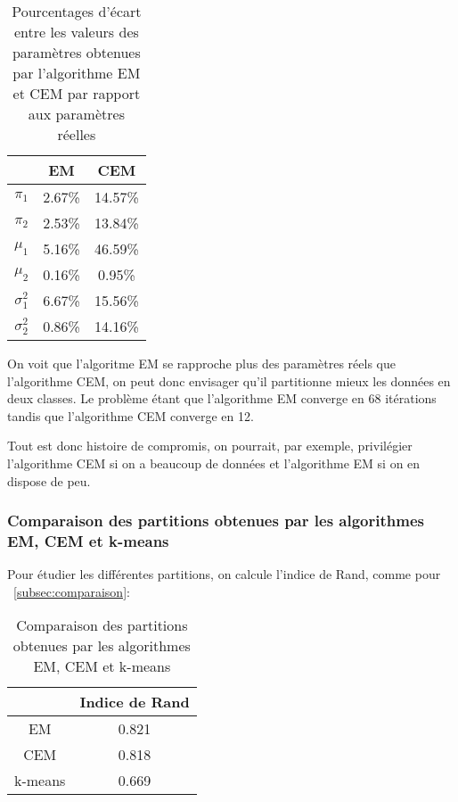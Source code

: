 \documentclass{article}
\begin{document}
\begin{multicols}{2}
\begin{table}[H]
\begin{center}
    \centering
    \captionsetup{justification=centering}
    \caption{\label{tab:percentEcart}Pourcentages d'écart entre les valeurs des paramètres obtenues par l'algorithme EM et CEM par rapport aux paramètres réelles}
    \begin{tabular}{|c|c|c|}
        \hline
        & EM & CEM \\
        \hline
        $\pi_1$ & 2.67\% & 14.57\% \\
        \hline
        $\pi_2$ & 2.53\% & 13.84\% \\
        \hline
        $\mu_1$ & 5.16\% & 46.59\% \\
        \hline
        $\mu_2$ & 0.16\% & 0.95\% \\
        \hline
        $\sigma_1^2$ & 6.67\% & 15.56\% \\
        \hline
        $\sigma_2^2$ & 0.86\% & 14.16\% \\
        \hline
    \end{tabular}
\end{center}
\end{table}

On voit que l'algoritme EM se rapproche plus des paramètres réels que
l'algorithme CEM, on peut donc envisager qu'il partitionne mieux les données en
deux classes. Le problème étant que l'algorithme EM converge en 68 itérations
tandis que l'algorithme CEM converge en 12.

Tout est donc histoire de compromis, on pourrait, par exemple, privilégier
l'algorithme CEM si on a beaucoup de données et l'algorithme EM si on en dispose
de peu.

\subsubsection{Comparaison des partitions obtenues par les algorithmes EM, CEM et k-means}\label{subsubsec:ex214}

Pour étudier les différentes partitions, on calcule l'indice de Rand, comme pour
~\ref{subsec:comparaison}:

\begin{table}[H]
\centering
\captionsetup{justification=centering}
\caption{\label{tab:partComparison}Comparaison des partitions obtenues par les algorithmes EM, CEM et k-means}
\begin{tabular}{|c|c|}
    \hline
    & Indice de Rand \\
    \hline
    EM & 0.821 \\
    \hline
    CEM & 0.818 \\
    \hline
    k-means & 0.669 \\
    \hline
\end{tabular}
\end{table}


\end{multicols}
\end{document}
